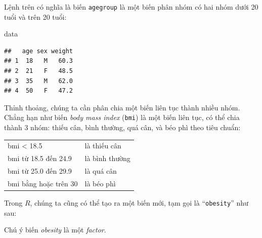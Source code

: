 \documentclass[
]{book}
\newenvironment{Shaded}{\begin{snugshade}}{\end{snugshade}}
\newcommand{\FloatTok}[1]{\textcolor[rgb]{0.00,0.00,0.81}{#1}}
\newcommand{\NormalTok}[1]{#1}
\newcommand{\OperatorTok}[1]{\textcolor[rgb]{0.81,0.36,0.00}{\textbf{#1}}}
\newcommand{\StringTok}[1]{\textcolor[rgb]{0.31,0.60,0.02}{#1}}
\begin{document}
Lệnh trên có nghĩa là biến \texttt{agegroup} là một biến phân nhóm có hai nhóm dưới 20 tuổi và trên 20 tuổi:

\begin{Shaded}
\begin{Highlighting}[]
\NormalTok{data}
\end{Highlighting}
\end{Shaded}

\begin{verbatim}
##   age sex weight
## 1  18   M   60.3
## 2  21   F   48.5
## 3  35   M   62.0
## 4  50   F   47.2
\end{verbatim}

Thỉnh thoảng, chúng ta cần phân chia một biến liên tục thành nhiều nhóm. Chẳng hạn như biến \emph{body mass index} (\texttt{bmi}) là một biến liên tục, có thể chia thành 3 nhóm: thiếu cân, bình thường, quá cân, và béo phì theo tiêu chuẩn:

\begin{longtable}[]{@{}ll@{}}
\toprule
\endhead
bmi \textless{} 18.5 & là thiếu cân\tabularnewline
bmi từ 18.5 đến 24.9 & là bình thường\tabularnewline
bmi từ 25.0 đến 29.9 & là quá cân\tabularnewline
bmi bằng hoặc trên 30 & là béo phì\tabularnewline
\bottomrule
\end{longtable}

Trong \(R\), chúng ta cũng có thể tạo ra một biến mới, tạm gọi là ``\texttt{obesity}'' như sau:

\begin{Shaded}
\end{Shaded}

Chú ý biến \emph{obesity} là một \emph{factor}.
\end{document}
